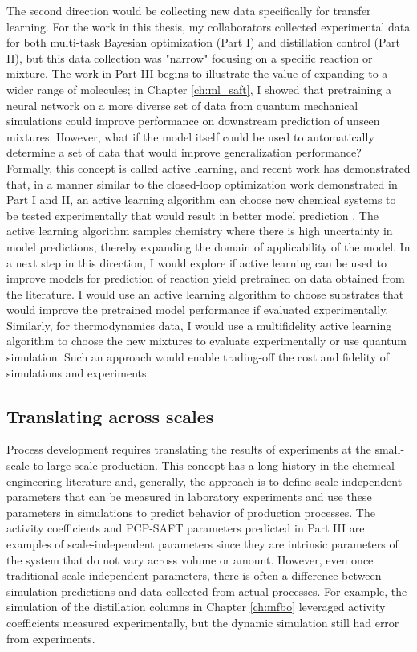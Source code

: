 The second direction would be collecting new data specifically for transfer learning. For the work in this thesis, my collaborators collected experimental data for both multi-task Bayesian optimization (Part I) and distillation control (Part II), but this data collection was "narrow" focusing on a specific reaction or mixture. The work in Part III begins to illustrate the value of expanding to a wider range of molecules; in Chapter \ref{ch:ml_saft}, I showed that pretraining a neural network on a more diverse set of data from quantum mechanical simulations could improve performance on downstream prediction of unseen mixtures. However, what if the model itself could be used to automatically determine a set of data that would  improve generalization performance? Formally, this concept is called active learning, and recent work has demonstrated that, in a manner similar to the closed-loop optimization work demonstrated in Part I and II, an active learning algorithm can choose new chemical systems to be tested experimentally that would result in better model prediction \cite{Angello2022}. The active learning algorithm samples chemistry where there is high uncertainty in model predictions, thereby expanding the domain of applicability of the model.  In a next step in this direction, I would explore if active learning can be used to improve models for prediction of reaction yield pretrained on data obtained from the literature. I would use an active learning algorithm to choose substrates that would improve the pretrained model performance if evaluated experimentally. Similarly, for thermodynamics data, I would use a multifidelity active learning algorithm to choose the new mixtures to evaluate experimentally or use quantum simulation. Such an approach would enable trading-off the cost and fidelity of simulations and experiments. 

\subsection{Translating across scales}

Process development requires translating the results of experiments at the small-scale to large-scale production. This concept has a long history in the chemical engineering literature and, generally, the approach is to define scale-independent parameters that can be measured in laboratory experiments and use these parameters in simulations to predict behavior of production processes. The activity coefficients and PCP-SAFT parameters predicted in Part III are examples of scale-independent parameters since they are intrinsic parameters of the system that do not vary across volume or amount. However, even once traditional  scale-independent parameters, there is often a difference between simulation predictions and data collected from actual processes. For example, the simulation of the distillation columns in Chapter \ref{ch:mfbo} leveraged activity coefficients measured experimentally, but the dynamic simulation still had error from experiments. 

